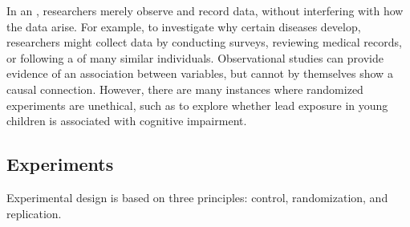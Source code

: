 In an , researchers merely observe and record data, without interfering with how the data arise. For example, to investigate why certain diseases develop, researchers might collect data by conducting surveys, reviewing medical records, or following a  of many similar individuals. Observational studies can provide evidence of an association between variables, but cannot by themselves show a causal connection. However, there are many instances where randomized experiments are unethical, such as to explore whether lead exposure in young children is associated with cognitive impairment. 

\subsection[Experiments]{Experiments}
\label{experiments}

\textD{\noindent}%
Experimental design is based on three principles: control, randomization, and replication.


